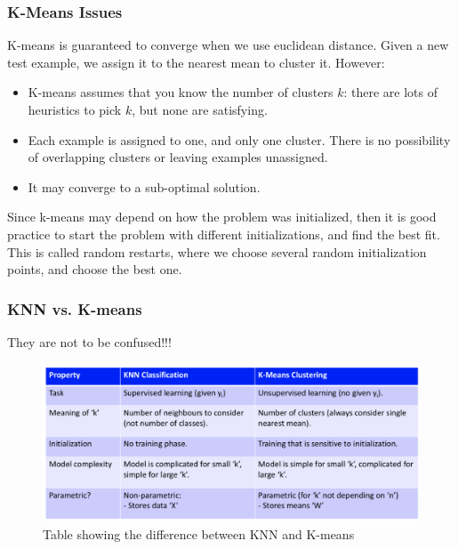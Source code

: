 \documentclass{article}
\def\blu#1{{\color{blu}#1}}
\def\gre#1{{\color{gre}#1}}
\def\red#1{{\color{red}#1}}
\theoremstyle{definition}
\begin{document}
\subsubsection*{K-Means Issues}
K-means is \gre{guaranteed to converge when we use euclidean distance}. Given a new test example, we \gre{assign it to the nearest mean to cluster it}. However:
\begin{itemize}
	\item K-means assumes that \red{you know the number of clusters $ k $}: there are lots of heuristics to pick $ k $, but none are satisfying. 
	\item Each example is assigned to \red{one, and only one cluster}. There is no possibility of overlapping clusters or leaving examples unassigned. 
	\item It may converge to a \red{sub-optimal solution}. 
\end{itemize}
Since k-means may depend on how the problem was initialized, then it is good practice to start the problem with different initializations, and find the best fit. This is called \blu{random restarts}, where we choose several random initialization points, and choose the best one. 

\subsubsection*{KNN vs. K-means}
They are \gre{not to be confused!!!}
\begin{figure}[H]
	\centering
	\includegraphics[width = 4.5in]{Pic9}
	\caption{Table showing the difference between KNN and K-means}
\end{figure}
\end{document}
